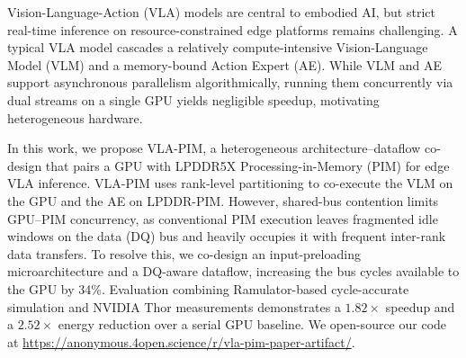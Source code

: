 Vision-Language-Action (VLA) models are central to embodied AI, but strict real-time inference on resource-constrained edge platforms remains challenging. A typical VLA model cascades a relatively compute-intensive Vision-Language Model (VLM) and a memory-bound Action Expert (AE). While VLM and AE support asynchronous parallelism algorithmically, running them concurrently via dual streams on a single GPU yields negligible speedup, motivating heterogeneous hardware.

In this work, we propose VLA-PIM, a heterogeneous architecture--dataflow co-design that pairs a GPU with LPDDR5X Processing-in-Memory (PIM) for edge VLA inference. VLA-PIM uses rank-level partitioning to co-execute the VLM on the GPU and the AE on LPDDR-PIM. However, shared-bus contention limits GPU--PIM concurrency, as conventional PIM execution leaves fragmented idle windows on the data (DQ) bus and heavily occupies it with frequent inter-rank data transfers. To resolve this, we co-design an input-preloading microarchitecture and a DQ-aware dataflow, increasing the bus cycles available to the GPU by 34\%. Evaluation combining Ramulator-based cycle-accurate simulation and NVIDIA Thor measurements demonstrates a $1.82\times$ speedup and a $2.52\times$ energy reduction over a serial GPU baseline. We open-source our code at \url{https://anonymous.4open.science/r/vla-pim-paper-artifact/}.
